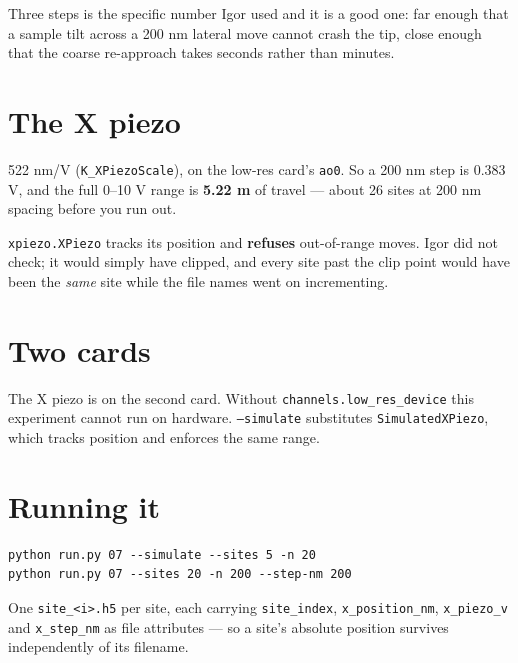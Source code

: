 Three steps is the specific number Igor used and it is a good one: far enough that a sample tilt across a 200 nm lateral move cannot crash the tip, close enough that the coarse re-approach takes seconds rather than minutes.

\section{The X piezo}

522 nm/V (\texttt{K\_\discretionary{}{}{}XPiezo\discretionary{}{}{}Scale}), on the low-res card's \texttt{ao0}. So a 200 nm step is 0.383 V, and the full 0--10 V range is \textbf{5.22 \textmu{}m} of travel --- about 26 sites at 200 nm spacing before you run out.

\texttt{xpiezo.\discretionary{}{}{}XPiezo} tracks its position and \textbf{refuses} out-of-range moves. Igor did not check; it would simply have clipped, and every site past the clip point would have been the \emph{same} site while the file names went on incrementing.

\section{Two cards}

The X piezo is on the second card. Without \texttt{channels.\discretionary{}{}{}low\_\discretionary{}{}{}res\_\discretionary{}{}{}device} this experiment cannot run on hardware. \texttt{--simulate} substitutes \texttt{Simulated\discretionary{}{}{}XPiezo}, which tracks position and enforces the same range.

\section{Running it}

\begin{lstlisting}[style=out]
python run.py 07 --simulate --sites 5 -n 20
python run.py 07 --sites 20 -n 200 --step-nm 200
\end{lstlisting}

One \texttt{site\_\discretionary{}{}{}<i>.\discretionary{}{}{}h5} per site, each carrying \texttt{site\_\discretionary{}{}{}index}, \texttt{x\_\discretionary{}{}{}position\_\discretionary{}{}{}nm}, \texttt{x\_\discretionary{}{}{}piezo\_\discretionary{}{}{}v} and \texttt{x\_\discretionary{}{}{}step\_\discretionary{}{}{}nm} as file attributes --- so a site's absolute position survives independently of its filename.

